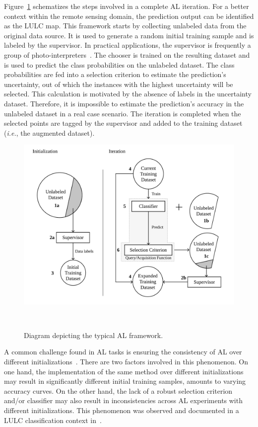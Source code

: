 Figure~\ref{fig:al_typical} schematizes the steps involved in a complete AL
iteration. For a better context within the remote sensing domain, the
prediction output can be identified as the LULC map. This
framework starts by collecting unlabeled data from the original data source.
It is used to generate a random initial training sample and is labeled by the
supervisor. In practical applications, the supervisor is frequently a group of
photo-interpreters~\cite{Kottke2017}. The chooser is trained on the resulting
dataset and is used to predict the class probabilities on the unlabeled
dataset. The class probabilities are fed into a selection criterion to
estimate the prediction's uncertainty, out of which the instances with the
highest uncertainty will be selected. This calculation is motivated by the
absence of labels in the uncertainty dataset. Therefore, it is impossible to
estimate the prediction's accuracy in the unlabeled dataset in a real case
scenario. The iteration is completed when the selected points are tagged by
the supervisor and added to the training dataset (\textit{i.e.}, the augmented
dataset). 

\begin{figure}[htb]
	\centering
	\includegraphics[width=.7\linewidth]{al_typical}
	\caption{Diagram depicting the typical AL framework.
    }~\label{fig:al_typical}
\end{figure}

A common challenge found in AL tasks is ensuring the consistency of AL over
different initializations~\cite{Kottke2017}. There are two factors involved in
this phenomenon. On one hand, the implementation of the same method over
different initializations may result in significantly different initial
training samples, amounts to varying accuracy curves. On the other hand, the
lack of a robust selection criterion and/or classifier may
also result in inconsistencies across AL experiments with different
initializations. This phenomenon was observed and documented in a LULC
classification context in~\cite{tuia2011using}.

